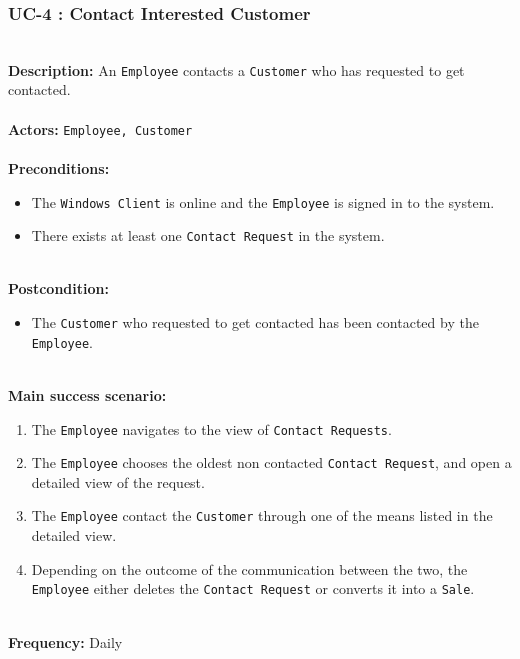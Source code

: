 \subsubsection{UC-4 : Contact Interested Customer}
\label{contact-interested-customer-use-case}
\HRule \\[0.4cm]
\textbf{Description:} An \texttt{Employee} contacts a \texttt{Customer} who has requested to get contacted. \\
\HRule \\[0.4cm]
\textbf{Actors:} \texttt{Employee, Customer}\\
\HRule \\[0.4cm]
\textbf{Preconditions:} 
\begin{itemize}
    \item The \texttt{Windows Client} is online and the \texttt{Employee} is signed in to the system.
    \item There exists at least one \texttt{Contact Request} in the system.
\end{itemize}
\HRule \\[0.4cm]
\textbf{Postcondition:}
\begin{itemize}
    \item The \texttt{Customer} who requested to get contacted has been contacted by the \texttt{Employee}.
\end{itemize}
\HRule \\[0.4cm]
\textbf{Main success scenario:}
\begin{enumerate}
    \item The \texttt{Employee} navigates to the view of \texttt{Contact Requests}.
    \item The \texttt{Employee} chooses the oldest non contacted \texttt{Contact Request}, and open a detailed view of the request.
    \item The \texttt{Employee} contact the \texttt{Customer} through one of the means listed in the detailed view.
    \item Depending on the outcome of the communication between the two, the \texttt{Employee} either deletes the \texttt{Contact Request} or converts it into a \texttt{Sale}.
\end{enumerate}
\HRule \\[0.4cm]
\textbf{Frequency:}
Daily \\
\HRule \\[0.4cm]

